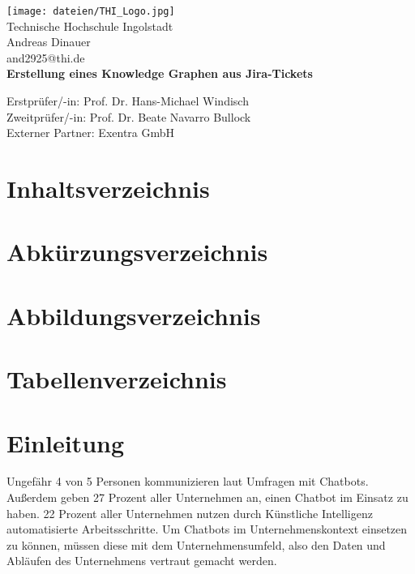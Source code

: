\documentclass{article}
\begin{document}
\renewcommand\thesection{\Roman{section}}
\begin{titlepage}
    \begin{center}
        \texttt{[image: dateien/THI\_Logo.jpg]} \\
        \vspace{0.5cm}
        Technische Hochschule Ingolstadt\\
        \vspace{1cm}
        \normalsize
        Andreas Dinauer\\
        and2925@thi.de\\
        
        \vspace*{0.5cm}
        \LARGE
        \textbf{Erstellung eines Knowledge Graphen aus Jira-Tickets}
            
        \vspace{1cm}
        \normalsize
        Erstprüfer/-in: Prof. Dr. Hans-Michael Windisch \\
        Zweitprüfer/-in: Prof. Dr. Beate Navarro Bullock \\
        \vspace{1cm}
        \normalsize
        Externer Partner: Exentra GmbH
            
    \end{center}
\end{titlepage}

\newpage

\section{Inhaltsverzeichnis}
\newpage
\section{Abkürzungsverzeichnis}
\newpage
\section{Abbildungsverzeichnis}
\newpage
\section{Tabellenverzeichnis}
\newpage
\setcounter{section}{0}
\renewcommand\thesection{\arabic{section}}
\section{Einleitung}
Ungefähr 4 von 5 Personen kommunizieren laut Umfragen mit Chatbots. Außerdem geben 27 Prozent aller Unternehmen an, einen Chatbot im Einsatz zu haben. 22 Prozent aller Unternehmen nutzen durch Künstliche Intelligenz automatisierte Arbeitsschritte. Um Chatbots im Unternehmenskontext einsetzen zu können, müssen diese mit dem Unternehmensumfeld, also den Daten und Abläufen des Unternehmens vertraut gemacht werden.
\end{document}
